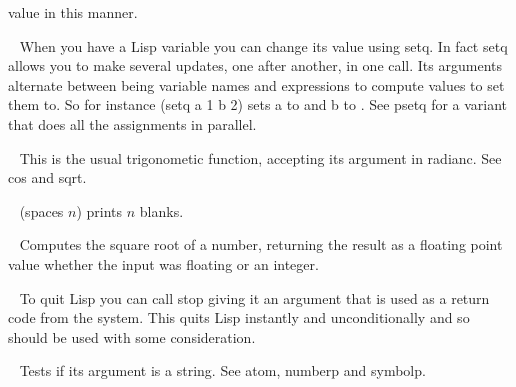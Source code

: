 \begin{description}
value in this manner.
\item[{\tx setq~~~~~~~~~} \hspace{1cm} {\em special form}]~\newline
When you have a Lisp variable you can change its value using {\tx setq}. In
fact {\tx setq} allows you to make several updates, one after another, in one
call. Its arguments alternate between being variable names and expressions
to compute values to set them to. So for instance {\tx (setq a 1 b 2)} sets
{\tx a} to {} and {\tx b} to {}. See {\tx psetq} for a variant that
does all the assignments in parallel.
\item[{\tx sin~~~~~~~~~~} \hspace{1cm} {\em function 1 arg}]~\newline
This is the usual trigonometic function, accepting its argument in
radianc. See {\tx cos} and {\tx sqrt}.
\item[{\tx spaces~~~~~~~} \hspace{1cm} {\em function 1 arg}]~\newline
{\tx (spaces $n$)} prints $n$ blanks.
\item[{\tx sqrt~~~~~~~~~} \hspace{1cm} {\em function 1 arg}]~\newline
Computes the square root of a number, returning the result as a floating
point value whether the input was floating or an integer.
\item[{\tx stop~~~~~~~~~} \hspace{1cm} {\em function 1 arg}]~\newline
To quit Lisp you can call {\tx stop} giving it an argument that is used as
a return code from the system. This quits Lisp instantly and unconditionally
and so should be used with some consideration.
\item[{\tx stringp~~~~~~} \hspace{1cm} {\em function 1 arg}]~\newline
Tests if its argument is a string. See {\tx atom}, {\tx numberp} and
{\tx symbolp}.
\item[{\tx sub1~~~~~~~~~} \hspace{1cm} {\em function 1 arg}]~\newline

\end{description}
